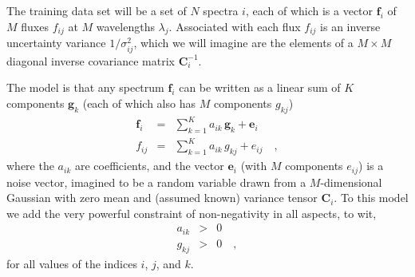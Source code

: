 \documentclass[preprint]{aastex}
\newcounter{address}
\newcommand{\project}[1]{\textsl{#1}}
\newcommand{\mmatrix}[1]{\boldsymbol{#1}}
\newcommand{\inverse}[1]{{#1}^{-1}}
\newcommand{\covar}{\mmatrix{C}}
\newcommand{\evec}{\mmatrix{e}}
\newcommand{\fvec}{\mmatrix{f}}
\newcommand{\gvec}{\mmatrix{g}}
\newcommand{\invvar}{\inverse{\covar}}
\newcommand{\documentname}{\textsl{Note}}
\begin{document}





The training data set will be a set of $N$ spectra $i$, each of which
is a vector $\fvec_i$ of $M$ fluxes $f_{ij}$ at $M$ wavelengths
$\lambda_j$.  Associated with each flux $f_{ij}$ is an inverse
uncertainty variance $1/\sigma^2_{ij}$, which we will imagine are the
elements of a $M\times M$ diagonal inverse covariance matrix
$\invvar_{i}$.

The model is that any spectrum $\fvec_i$ can be written as a linear
sum of $K$ components $\gvec_k$ (each of which also has $M$ components
$g_{kj}$)
\begin{eqnarray}\displaystyle
\fvec_i &=& \sum_{k=1}^K a_{ik}\,\gvec_k + \evec_i \nonumber\\
f_{ij} &=& \sum_{k=1}^K a_{ik}\,g_{kj} + e_{ij}
\quad,
\end{eqnarray}
where the $a_{ik}$ are coefficients, and the vector $\evec_i$ (with
$M$ components $e_{ij}$) is a noise vector, imagined to be a random
variable drawn from a $M$-dimensional Gaussian with zero mean and
(assumed known) variance tensor $\covar_i$.  To this model we add the
very powerful constraint of non-negativity in all aspects, to wit,
\begin{eqnarray}\displaystyle
a_{ik} &>& 0
\nonumber\\
g_{kj} &>& 0
\quad,
\end{eqnarray}
for all values of the indices $i$, $j$, and $k$.
\end{document}
